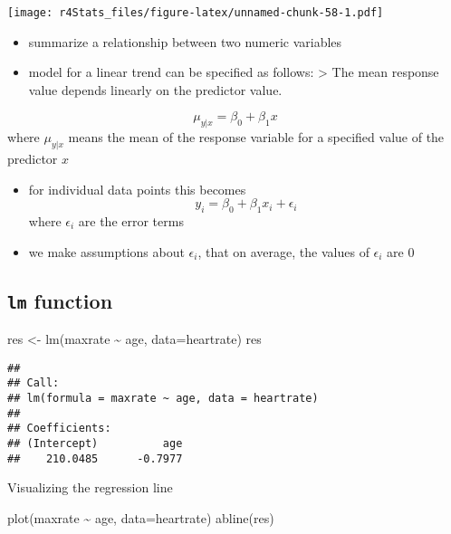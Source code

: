 \documentclass[
]{book}
\newenvironment{Shaded}{\begin{snugshade}}{\end{snugshade}}
\newcommand{\AttributeTok}[1]{\textcolor[rgb]{0.77,0.63,0.00}{#1}}
\newcommand{\FunctionTok}[1]{\textcolor[rgb]{0.00,0.00,0.00}{#1}}
\newcommand{\NormalTok}[1]{#1}
\newcommand{\OtherTok}[1]{\textcolor[rgb]{0.56,0.35,0.01}{#1}}
\newcommand{\SpecialCharTok}[1]{\textcolor[rgb]{0.00,0.00,0.00}{#1}}
\providecommand{\tightlist}{%
  \setlength{\itemsep}{0pt}\setlength{\parskip}{0pt}}
\theoremstyle{definition}
\theoremstyle{definition}
\theoremstyle{definition}
\theoremstyle{definition}
\theoremstyle{remark}
\begin{document}
\texttt{[image: r4Stats\_files/figure-latex/unnamed-chunk-58-1.pdf]}

\begin{itemize}
\tightlist
\item
  summarize a relationship between two numeric variables
\item
  model for a linear trend can be specified as follows:
  \textgreater{} The mean response value depends linearly on the predictor value.
\end{itemize}

\[
\mu_{y|x}=\beta_0+\beta_1x 
\]
where \(\mu_{y|x}\) means the mean of the response variable for a specified value of the predictor \(x\)

\begin{itemize}
\tightlist
\item
  for individual data points this becomes
  \[
  y_i=\beta_0+\beta_1x_i+\epsilon_i 
  \]
  where \(\epsilon_i\) are the error terms
\item
  we make assumptions about \(\epsilon_i\), that on average, the values of \(\epsilon_i\) are 0
\end{itemize}

\hypertarget{lm-function}{%
\subsection{\texorpdfstring{\texttt{lm} function}{lm function}}\label{lm-function}}

\begin{Shaded}
\begin{Highlighting}[]
\NormalTok{res }\OtherTok{\textless{}{-}} \FunctionTok{lm}\NormalTok{(maxrate }\SpecialCharTok{\textasciitilde{}}\NormalTok{ age, }\AttributeTok{data=}\NormalTok{heartrate)}
\NormalTok{res}
\end{Highlighting}
\end{Shaded}

\begin{verbatim}
## 
## Call:
## lm(formula = maxrate ~ age, data = heartrate)
## 
## Coefficients:
## (Intercept)          age  
##    210.0485      -0.7977
\end{verbatim}

Visualizing the regression line

\begin{Shaded}
\begin{Highlighting}[]
\FunctionTok{plot}\NormalTok{(maxrate }\SpecialCharTok{\textasciitilde{}}\NormalTok{ age, }\AttributeTok{data=}\NormalTok{heartrate)}
\FunctionTok{abline}\NormalTok{(res)}
\end{Highlighting}
\end{Shaded}
\end{document}
